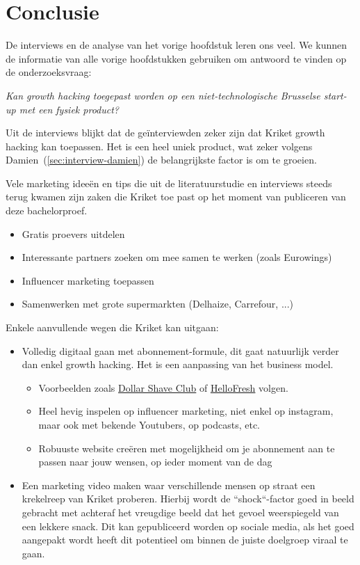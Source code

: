 
\chapter{Conclusie}
\label{ch:conclusie}

De interviews en de analyse van het vorige hoofdstuk leren ons veel. We kunnen de informatie van alle vorige hoofdstukken gebruiken om antwoord te vinden op de onderzoeksvraag:

\emph{Kan growth hacking toegepast worden op een niet-technologische Brusselse start-up met een fysiek product?}

Uit de interviews blijkt dat de geïnterviewden zeker zijn dat Kriket growth hacking kan toepassen. Het is een heel uniek product, wat zeker volgens Damien~(\ref{sec:interview-damien}) de belangrijkste factor is om te groeien. 

Vele marketing ideeën en tips die uit de literatuurstudie en interviews steeds terug kwamen zijn zaken die Kriket toe past op het moment van publiceren van deze bachelorproef. 
\begin{itemize}
	\item Gratis proevers uitdelen
	\item Interessante partners zoeken om mee samen te werken (zoals Eurowings)
	\item Influencer marketing toepassen
	\item Samenwerken met grote supermarkten (Delhaize, Carrefour, ...)
\end{itemize}

Enkele aanvullende wegen die Kriket kan uitgaan:
\begin{itemize}
	\item Volledig digitaal gaan met abonnement-formule, dit gaat natuurlijk verder dan enkel growth hacking. Het is een aanpassing van het business model.
	\begin{itemize}
		\item Voorbeelden zoals \href{https://www.dollarshaveclub.com/}{Dollar Shave Club} of \href{https://www.hellofresh.be/}{HelloFresh} volgen.
		\item Heel hevig inspelen op influencer marketing, niet enkel op instagram, maar ook met bekende Youtubers, op podcasts, etc.
		\item Robuuste website creëren met mogelijkheid om je abonnement aan te passen naar jouw wensen, op ieder moment van de dag
	\end{itemize}
	\item Een marketing video maken waar verschillende mensen op straat een krekelreep van Kriket proberen. Hierbij wordt de ``shock``-factor goed in beeld gebracht met achteraf het vreugdige beeld dat het gevoel weerspiegeld van een lekkere snack. Dit kan gepubliceerd worden op sociale media, als het goed aangepakt wordt heeft dit potentieel om binnen de juiste doelgroep viraal te gaan.
\end{itemize}

